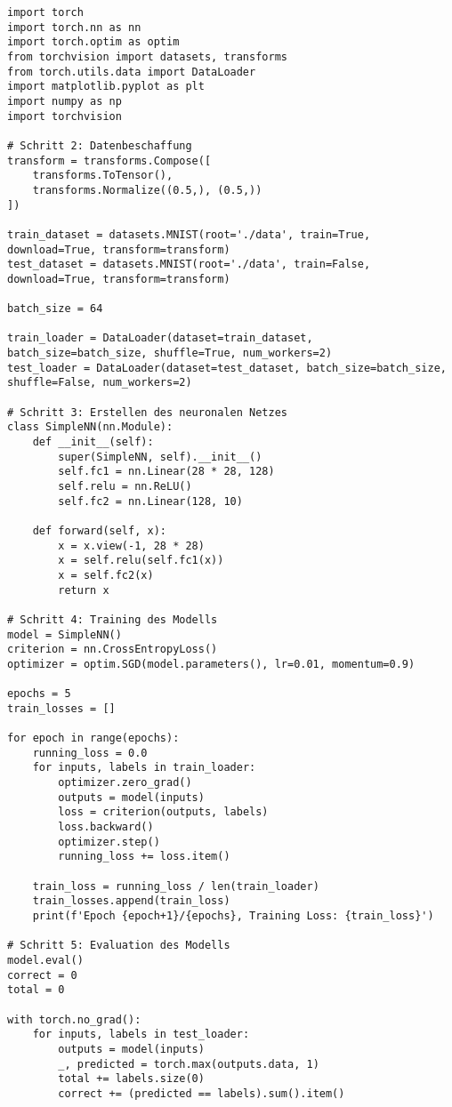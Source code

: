 \documentclass[a4paper,11pt,titlepage]{article}
\begin{document}
\begin{lstlisting}[style=python]
import torch
import torch.nn as nn
import torch.optim as optim
from torchvision import datasets, transforms
from torch.utils.data import DataLoader
import matplotlib.pyplot as plt
import numpy as np
import torchvision

# Schritt 2: Datenbeschaffung
transform = transforms.Compose([
    transforms.ToTensor(),
    transforms.Normalize((0.5,), (0.5,))
])

train_dataset = datasets.MNIST(root='./data', train=True, download=True, transform=transform)
test_dataset = datasets.MNIST(root='./data', train=False, download=True, transform=transform)

batch_size = 64

train_loader = DataLoader(dataset=train_dataset, batch_size=batch_size, shuffle=True, num_workers=2)
test_loader = DataLoader(dataset=test_dataset, batch_size=batch_size, shuffle=False, num_workers=2)

# Schritt 3: Erstellen des neuronalen Netzes
class SimpleNN(nn.Module):
    def __init__(self):
        super(SimpleNN, self).__init__()
        self.fc1 = nn.Linear(28 * 28, 128)
        self.relu = nn.ReLU()
        self.fc2 = nn.Linear(128, 10)

    def forward(self, x):
        x = x.view(-1, 28 * 28)
        x = self.relu(self.fc1(x))
        x = self.fc2(x)
        return x

# Schritt 4: Training des Modells
model = SimpleNN()
criterion = nn.CrossEntropyLoss()
optimizer = optim.SGD(model.parameters(), lr=0.01, momentum=0.9)

epochs = 5
train_losses = []

for epoch in range(epochs):
    running_loss = 0.0
    for inputs, labels in train_loader:
        optimizer.zero_grad()
        outputs = model(inputs)
        loss = criterion(outputs, labels)
        loss.backward()
        optimizer.step()
        running_loss += loss.item()

    train_loss = running_loss / len(train_loader)
    train_losses.append(train_loss)
    print(f'Epoch {epoch+1}/{epochs}, Training Loss: {train_loss}')

# Schritt 5: Evaluation des Modells
model.eval()
correct = 0
total = 0

with torch.no_grad():
    for inputs, labels in test_loader:
        outputs = model(inputs)
        _, predicted = torch.max(outputs.data, 1)
        total += labels.size(0)
        correct += (predicted == labels).sum().item()


\end{lstlisting}
\end{document}
